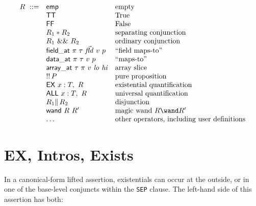 \documentclass[12pt,fleqn,openany,oneside,showtrims]{memoir}
\begin{document}
\[\begin{array}{lll}
R~::=&
\mathsf{emp} & \mbox{empty} \\
&\mathsf{TT} & \mbox{True} \\
&\mathsf{FF} & \mbox{False} \\
& R_1 * R_2 & \mbox{separating conjunction}\\
& R_1 ~\mathsf{\&\&}~ R_2 & \mbox{ordinary conjunction}\\
& \mathsf{field\_at}~\pi~\tau~\vec{\mathit{fld}}~v~p&
     \mbox{``field maps-to''} \\
& \mathsf{data\_at}~\pi~\tau~v~p& \mbox{``maps-to''} \\
& \mathsf{array\_at}~\tau~\pi~v~\mathit{lo}~\mathit{hi} & \mbox{array slice} \\
& \mathsf{!!}\,P & \mbox{pure proposition} \\
& \mathsf{EX}~x:T,~R & \mbox{existential quantification} \\
& \mathsf{ALL}~x:T,~R & \mbox{universal quantification} \\
& R_1 \mathsf{\|}\, R_2 & \mbox{disjunction}\\
& \mathsf{wand} ~R~ R' & \mbox{magic wand}~R \wand R'\\
& \ldots & \mbox{other operators, including user definitions}
\end{array}\]

\chapter{\upshape\textsf{EX, Intros, Exists}}
\label{refcard:EX}
\label{refcard:intros}

In a canonical-form lifted assertion, existentials can occur
at the outside, or in one of the base-level conjuncts within the
\lstinline{SEP} clause.  The left-hand side of this assertion has both:
\end{document}
